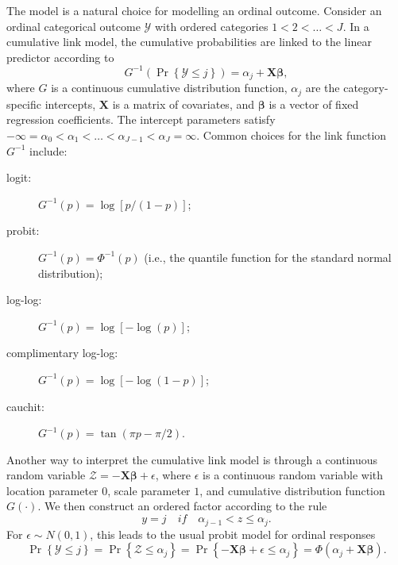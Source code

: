 The  model is a natural choice for modelling an ordinal outcome. Consider an ordinal categorical outcome $\mathcal{Y}$ with ordered categories $1 < 2 < \dots < J$. In a cumulative link model, the cumulative probabilities are linked to the linear predictor according to
\begin{equation}
\label{eqn:clm}
  G^{-1}\left(\Pr\left\{\mathcal{Y} \le j\right\}\right) = \alpha_j + \boldsymbol{X}\boldsymbol{\beta},
\end{equation}
where $G$ is a continuous cumulative distribution function, $\alpha_j$ are the category-specific intercepts, $\boldsymbol{X}$ is a matrix of covariates, and $\boldsymbol{\beta}$ is a vector of fixed regression coefficients. The intercept parameters satisfy $-\infty = \alpha_0 < \alpha_1 < \dots < \alpha_{J-1} < \alpha_J = \infty$. Common choices for the link function $G^{-1}$ include:
\begin{description}
  \item[logit:] $G^{-1}\left(p\right) = \log\left[p / \left(1 - p\right)\right]$;
  \item[probit:] $G^{-1}\left(p\right) = \Phi^{-1}\left(p\right)$ (i.e., the quantile function for the standard normal distribution);
  \item[log-log:] $G^{-1}\left(p\right) = \log\left[-\log\left(p\right)\right]$;
  \item[complimentary log-log:] $G^{-1}\left(p\right) = \log\left[-\log\left(1 - p\right)\right]$;
  \item[cauchit:] $G^{-1}\left(p\right) = \tan\left(\pi p - \pi / 2\right)$.
\end{description}

Another way to interpret the cumulative link model is through a  continuous random variable $\mathcal{Z} = -\boldsymbol{X}\boldsymbol{\beta} + \epsilon$, where $\epsilon$ is a continuous random variable with location parameter $0$, scale parameter $1$, and cumulative distribution function $G\left(\cdot\right)$. We then construct an ordered factor according to the rule
\begin{equation*}
  y = j \quad if \quad \alpha_{j - 1} < z \le \alpha_j.
\end{equation*}
For $\epsilon \sim N\left(0, 1\right)$, this leads to the usual probit model for ordinal responses
\begin{equation*}
  \Pr\left\{\mathcal{Y} \le j\right\} = \Pr\left\{\mathcal{Z} \le \alpha_j\right\} = \Pr\left\{-\boldsymbol{X}\boldsymbol{\beta} + \epsilon \le \alpha_j\right\} = \Phi\left(\alpha_j + \boldsymbol{X}\boldsymbol{\beta}\right).
\end{equation*}

